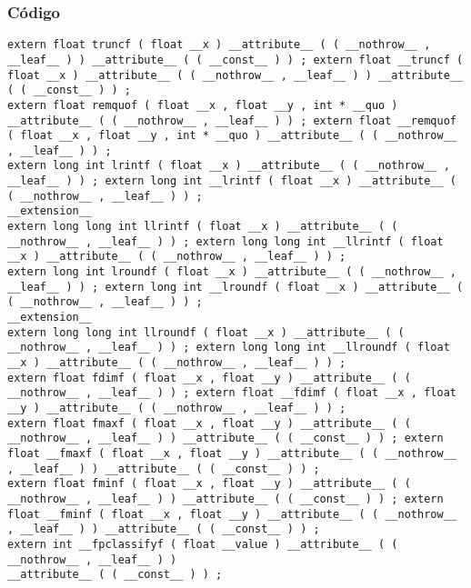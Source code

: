 \documentclass{beamer}
\begin{document}
\begin{frame}[fragile]
\frametitle{C\'odigo}
\begin{verbatim}
extern float truncf ( float __x ) __attribute__ ( ( __nothrow__ , __leaf__ ) ) __attribute__ ( ( __const__ ) ) ; extern float __truncf ( float __x ) __attribute__ ( ( __nothrow__ , __leaf__ ) ) __attribute__ ( ( __const__ ) ) ; 
extern float remquof ( float __x , float __y , int * __quo ) __attribute__ ( ( __nothrow__ , __leaf__ ) ) ; extern float __remquof ( float __x , float __y , int * __quo ) __attribute__ ( ( __nothrow__ , __leaf__ ) ) ; 
extern long int lrintf ( float __x ) __attribute__ ( ( __nothrow__ , __leaf__ ) ) ; extern long int __lrintf ( float __x ) __attribute__ ( ( __nothrow__ , __leaf__ ) ) ; 
__extension__ 
extern long long int llrintf ( float __x ) __attribute__ ( ( __nothrow__ , __leaf__ ) ) ; extern long long int __llrintf ( float __x ) __attribute__ ( ( __nothrow__ , __leaf__ ) ) ; 
extern long int lroundf ( float __x ) __attribute__ ( ( __nothrow__ , __leaf__ ) ) ; extern long int __lroundf ( float __x ) __attribute__ ( ( __nothrow__ , __leaf__ ) ) ; 
__extension__ 
extern long long int llroundf ( float __x ) __attribute__ ( ( __nothrow__ , __leaf__ ) ) ; extern long long int __llroundf ( float __x ) __attribute__ ( ( __nothrow__ , __leaf__ ) ) ; 
extern float fdimf ( float __x , float __y ) __attribute__ ( ( __nothrow__ , __leaf__ ) ) ; extern float __fdimf ( float __x , float __y ) __attribute__ ( ( __nothrow__ , __leaf__ ) ) ; 
extern float fmaxf ( float __x , float __y ) __attribute__ ( ( __nothrow__ , __leaf__ ) ) __attribute__ ( ( __const__ ) ) ; extern float __fmaxf ( float __x , float __y ) __attribute__ ( ( __nothrow__ , __leaf__ ) ) __attribute__ ( ( __const__ ) ) ; 
extern float fminf ( float __x , float __y ) __attribute__ ( ( __nothrow__ , __leaf__ ) ) __attribute__ ( ( __const__ ) ) ; extern float __fminf ( float __x , float __y ) __attribute__ ( ( __nothrow__ , __leaf__ ) ) __attribute__ ( ( __const__ ) ) ; 
extern int __fpclassifyf ( float __value ) __attribute__ ( ( __nothrow__ , __leaf__ ) ) 
__attribute__ ( ( __const__ ) ) ; 
\end{verbatim}
\end{frame}
\end{document}
